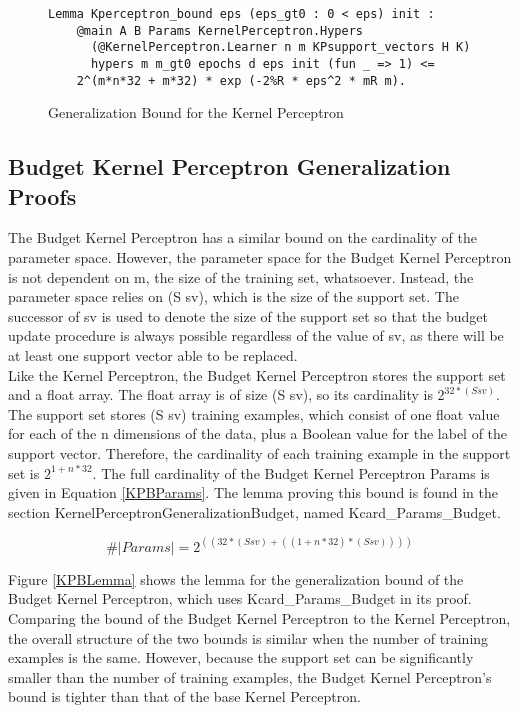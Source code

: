 \begin{figure}
    \caption{Generalization Bound for the Kernel Perceptron}
    \label{KPLemma}
    \begin{lstlisting}
Lemma Kperceptron_bound eps (eps_gt0 : 0 < eps) init : 
    @main A B Params KernelPerceptron.Hypers 
      (@KernelPerceptron.Learner n m KPsupport_vectors H K)
      hypers m m_gt0 epochs d eps init (fun _ => 1) <=
    2^(m*n*32 + m*32) * exp (-2%R * eps^2 * mR m).
    \end{lstlisting}
\end{figure}

\subsection{Budget Kernel Perceptron Generalization Proofs}\label{KPBProofs}
The Budget Kernel Perceptron has a similar bound on the cardinality of the parameter space. However, the parameter space for the Budget Kernel Perceptron is not dependent on m, the size of the training set, whatsoever. Instead, the parameter space relies on (S sv), which is the size of the support set. The successor of sv is used to denote the size of the support set so that the budget update procedure is always possible regardless of the value of sv, as there will be at least one support vector able to be replaced.
\\Like the Kernel Perceptron, the Budget Kernel Perceptron stores the support set and a float array. The float array is of size (S sv), so its cardinality is $2^{32 * (S sv)}$. The support set stores (S sv) training examples, which consist of one float value for each of the n dimensions of the data, plus a Boolean value for the label of the support vector. Therefore, the cardinality of each training example in the support set is $2^{1 + n * 32}$. The full cardinality of the Budget Kernel Perceptron Params is given in Equation \ref{KPBParams}. The lemma proving this bound is found in the section KernelPerceptronGeneralizationBudget, named Kcard\_Params\_Budget.

\begin{equation} \label{KPBParams}
 \#|Params| = 2^{((32*(S sv) + ((1 + n * 32)*(S sv))))}
\end{equation}

Figure \ref{KPBLemma} shows the lemma for the generalization bound of the Budget Kernel Perceptron, which uses Kcard\_Params\_Budget in its proof. Comparing the bound of the Budget Kernel Perceptron to the Kernel Perceptron, the overall structure of the two bounds is similar when the number of training examples is the same. However, because the support set can be significantly smaller than the number of training examples, the Budget Kernel Perceptron's bound is tighter than that of the base Kernel Perceptron. 


